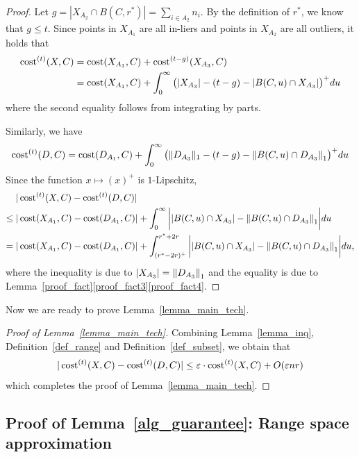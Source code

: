 \documentclass[11pt,letterpaper]{article}
\theoremstyle{definition}
\newcommand{\eps}{\varepsilon}
\newcommand{\LH}[1]{\textcolor{blue}{LH: #1}}
\DeclarePairedDelimiter{\norm}{\lVert}{\rVert}
\begin{document}
\begin{proof}

Let $g=|X_{A_2}\cap B(C,r^\ast)|=\sum_{i\in A_2} n_i$. By the definition of $r^\ast$, we know that $g\leq t$. Since points in $X_{A_1}$ are all in-liers and points in $X_{A_2}$ are all outliers, it holds that
\begin{align*}
\cost[t](X,C) &= \cost(X_{A_1},C)+\cost^{(t-g)}(X_{A_3},C)\\
&= \cost(X_{A_1},C)+\int_{0}^{\infty} \big( |X_{A_3}|-(t-g)-|B(C,u)\cap X_{A_3}|\big)^+du
\end{align*}
where the second equality follows from integrating by parts.

Similarly, we have 
\[
\cost[t](D,C) = \cost(D_{A_1},C) + \int_{0}^{\infty} \big( \norm{D_{A_3}}_1 - (t-g) -\norm*{B(C,u)\cap D_{A_3}}_1 \big)^+du
\]
Since the function $x\mapsto (x)^+$ is $1$-Lipschitz, 
\begin{align*}
& |\cost[t](X,C)-\cost[t](D,C)| \\
\leq{} & |\cost(X_{A_1},C)-\cost(D_{A_1},C)|+\int_{0}^{\infty} \bigg||B(C,u)\cap X_{A_3}|-\norm*{B(C,u)\cap D_{A_3}}_1 \bigg| du \\
={} & |\cost(X_{A_1},C)-\cost(D_{A_1},C)|+\int_{(r^\ast-2r)^+}^{r^\ast+2r} \bigg||B(C,u)\cap X_{A_3}|-\norm*{B(C,u)\cap D_{A_3}}_1 \bigg| du,
\end{align*}
where the inequality is due to $|X_{A_3}| = \norm*{D_{A_3}}_1$ and the equality is due to Lemma~\ref{proof_fact}\ref{proof_fact3}\ref{proof_fact4}.
\end{proof}

Now we are ready to prove Lemma~\ref{lemma_main_tech}.


\begin{proof}[Proof of Lemma~\ref{lemma_main_tech}]

    Combining Lemma~\ref{lemma_inq}, Definition~\ref{def_range} and Definition~\ref{def_subset}, we obtain that $$
|\cost[t](X,C)-\cost[t](D,C)|\leq \eps\cdot \cost[t](X,C) + O(\eps n r)
$$
which completes the proof of Lemma~\ref{lemma_main_tech}.
\end{proof}







\subsection{Proof of Lemma~\ref{alg_guarantee}: Range space approximation}\label{sec:alg_guarantee_proof}
\end{document}
